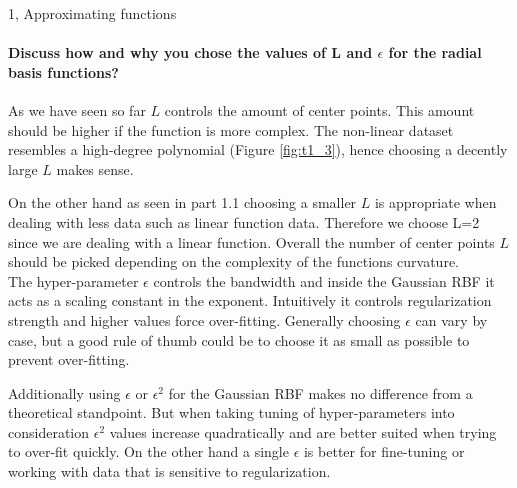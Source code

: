 \begin{task}{1, Approximating functions}
\paragraph{Discuss how and why you chose the values of L and $\epsilon$ for the radial basis functions?}
As we have seen so far $L$ controls the amount of center points. This amount should be higher if the function is more complex. The non-linear dataset resembles a high-degree polynomial (Figure \ref{fig:t1_3}), hence choosing a decently large $L$ makes sense.

On the other hand as seen in part 1.1 choosing a smaller $L$ is appropriate when dealing with less data such as linear function data. Therefore we choose L=2 since we are dealing with a linear function. Overall the number of center points $L$ should be picked depending on the complexity of the functions curvature.\\

The hyper-parameter $\epsilon$ controls the bandwidth and inside the Gaussian RBF it acts as a scaling constant in the exponent. Intuitively it controls regularization strength and higher values force over-fitting. Generally choosing $\epsilon$ can vary by case, but a good rule of thumb could be to choose it as small as possible to prevent over-fitting.

Additionally using $\epsilon$ or $\epsilon^2$ for the Gaussian RBF makes no difference from a theoretical standpoint. But when taking tuning of hyper-parameters into consideration $\epsilon^2$ values increase quadratically and are better suited when trying to over-fit quickly. On the other hand a single $\epsilon$ is better for fine-tuning or working with data that is sensitive to regularization.
\end{task}